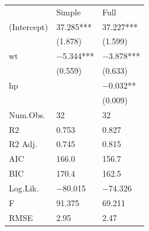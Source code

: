 \begin{tabular}{lll}
& Simple & Full \\
(Intercept) & \num{37.285}*** & \num{37.227}*** \\
& (\num{1.878}) & (\num{1.599}) \\
wt & \num{-5.344}*** & \num{-3.878}*** \\
& (\num{0.559}) & (\num{0.633}) \\
hp &  & \num{-0.032}** \\
&  & (\num{0.009}) \\
Num.Obs. & \num{32} & \num{32} \\
R2 & \num{0.753} & \num{0.827} \\
R2 Adj. & \num{0.745} & \num{0.815} \\
AIC & \num{166.0} & \num{156.7} \\
BIC & \num{170.4} & \num{162.5} \\
Log.Lik. & \num{-80.015} & \num{-74.326} \\
F & \num{91.375} & \num{69.211} \\
RMSE & \num{2.95} & \num{2.47} \\
\end{tabular}
